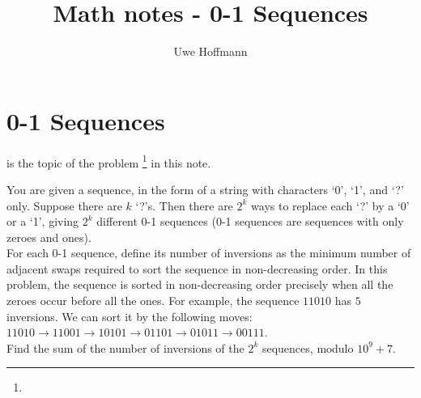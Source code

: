 

\title{Math notes - 0-1 Sequences}
\author{Uwe Hoffmann}



\setcounter{chapter}{1}
\section*{0-1 Sequences}

 is the topic of the problem \footnote{} in this note.

\begin{fullwidth}

\vspace{10 mm}
\begin{problem}
You are given a sequence, in the form of a string with characters `0', `1', and `?' only. Suppose there are $k$ `?'s. Then there are $2^k$ ways to replace each `?' by a `0' or a `1', giving $2 ^k$ different 0-1 sequences (0-1 sequences are sequences with only zeroes and ones).
\\
For each 0-1 sequence, define its number of inversions as the minimum number of adjacent swaps required to sort the sequence in non-decreasing order. In this problem, the sequence is sorted in non-decreasing order precisely when all the zeroes occur before all the ones. For example, the sequence $11010$ has $5$ inversions. We can sort it by the following moves: $11010 \rightarrow 11001 \rightarrow 10101 \rightarrow 01101 \rightarrow 01011 \rightarrow 00111$.
\\
Find the sum of the number of inversions of the $2^k$ sequences, $\text{modulo } 10^9+7$.
\end{problem}
\end{fullwidth}







